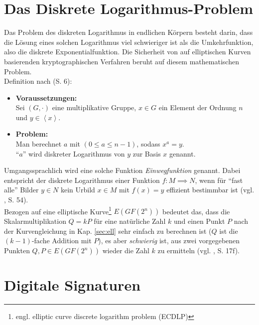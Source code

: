 \section{Das Diskrete Logarithmus-Problem} \label{sec:dlp}

Das Problem des diskreten Logarithmus in endlichen Körpern besteht darin, dass die Lösung eines solchen Logarithmus viel schwieriger ist als die Umkehrfunktion, also die diskrete Exponentialfunktion. Die Sicherheit von auf elliptischen Kurven basierenden kryptographischen Verfahren beruht auf diesem mathematischen Problem. \\

Definition nach \cite{baum} (S. 6):
\begin{itemize}
	\item \textbf{Voraussetzungen:}\\
	Sei $(G,\cdot)$ eine multiplikative Gruppe, $x \in G$ ein Element der Ordnung $n$ und $y \in \left \langle x \right \rangle$. \\
	\item \textbf{Problem:}\\
	Man berechnet $a$ mit $(0 \le a \le n-1)$, sodass $x^a = y$. \\
	``$a$'' wird diskreter Logarithmus von $y$ zur Basis $x$ genannt. \\
\end{itemize}

Umgangssprachlich wird eine solche Funktion \textit{Einwegfunktion} genannt. Dabei entspricht der diskrete Logarithmus einer Funktion $f: M \implies N$, wenn für ``fast alle'' Bilder $y \in N$ kein Urbild $x \in M$ mit $f(x) = y$ effizient bestimmbar ist (vgl. \cite{diskrlog}, S. 54). \\

Bezogen auf eine elliptische Kurve\footnote{engl. elliptic curve discrete logarithm problem (ECDLP)} $E(GF(2^n))$ bedeutet das, dass die Skalarmultiplikation $Q = k P$ für eine natürliche Zahl $k$ und einen Punkt $P$ nach der Kurvengleichung in Kap. \ref{sec:ell} sehr einfach zu berechnen ist ($Q$ ist die $(k-1)$-fache Addition mit $P$), es aber \textit{schwierig} ist, aus zwei vorgegebenen Punkten $Q, P \in E(GF(2^n))$ wieder die Zahl $k$ zu ermitteln (vgl. \cite{puttmann}, S. 17f). \\


\section{Digitale Signaturen} \label{sec:digsig}

